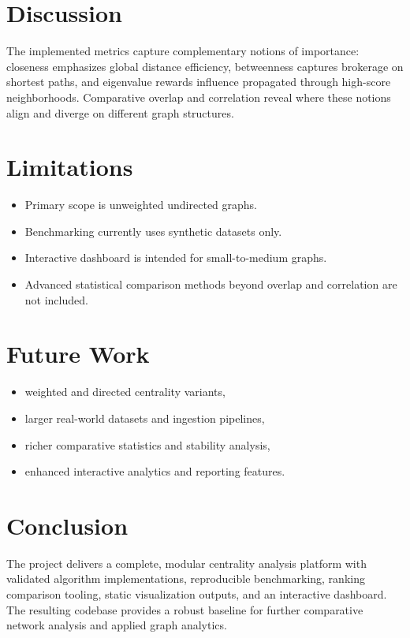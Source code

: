 \documentclass[11pt]{article}
\begin{document}
\section{Discussion}
The implemented metrics capture complementary notions of importance: closeness emphasizes global distance efficiency, betweenness captures brokerage on shortest paths, and eigenvalue rewards influence propagated through high-score neighborhoods. Comparative overlap and correlation reveal where these notions align and diverge on different graph structures.

\section{Limitations}
\begin{itemize}[leftmargin=*]
    \item Primary scope is unweighted undirected graphs.
    \item Benchmarking currently uses synthetic datasets only.
    \item Interactive dashboard is intended for small-to-medium graphs.
    \item Advanced statistical comparison methods beyond overlap and correlation are not included.
\end{itemize}

\section{Future Work}
\begin{itemize}[leftmargin=*]
    \item weighted and directed centrality variants,
    \item larger real-world datasets and ingestion pipelines,
    \item richer comparative statistics and stability analysis,
    \item enhanced interactive analytics and reporting features.
\end{itemize}

\section{Conclusion}
The project delivers a complete, modular centrality analysis platform with validated algorithm implementations, reproducible benchmarking, ranking comparison tooling, static visualization outputs, and an interactive dashboard. The resulting codebase provides a robust baseline for further comparative network analysis and applied graph analytics.
\end{document}
